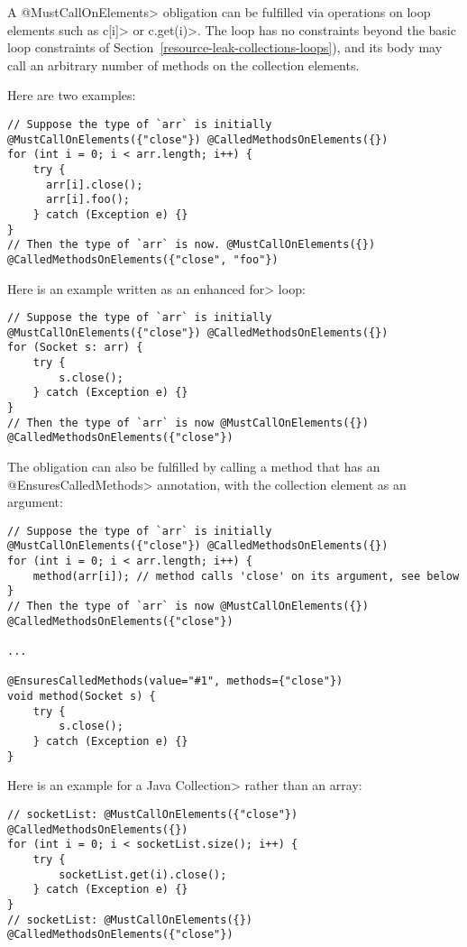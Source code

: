 A \<@MustCallOnElements> obligation can be fulfilled via operations on loop
elements such as \<c[i]> or \<c.get(i)>.
The loop has no constraints beyond the basic loop constraints of
Section~\ref{resource-leak-collections-loops}), and its body may call an
arbitrary number of methods on the collection elements.

Here are two examples:

\begin{verbatim}
// Suppose the type of `arr` is initially @MustCallOnElements({"close"}) @CalledMethodsOnElements({})
for (int i = 0; i < arr.length; i++) {
    try {
      arr[i].close();
      arr[i].foo();
    } catch (Exception e) {}
}
// Then the type of `arr` is now. @MustCallOnElements({}) @CalledMethodsOnElements({"close", "foo"})
\end{verbatim}

Here is an example written as an enhanced \<for> loop:

\begin{verbatim}
// Suppose the type of `arr` is initially @MustCallOnElements({"close"}) @CalledMethodsOnElements({})
for (Socket s: arr) {
    try {
        s.close();
    } catch (Exception e) {}
}
// Then the type of `arr` is now @MustCallOnElements({}) @CalledMethodsOnElements({"close"})
\end{verbatim}


The obligation can also be fulfilled by calling a method that has an
\<@EnsuresCalledMethods> annotation, with the collection element as an
argument:
\begin{verbatim}
// Suppose the type of `arr` is initially @MustCallOnElements({"close"}) @CalledMethodsOnElements({})
for (int i = 0; i < arr.length; i++) {
    method(arr[i]); // method calls 'close' on its argument, see below
}
// Then the type of `arr` is now @MustCallOnElements({}) @CalledMethodsOnElements({"close"})

...

@EnsuresCalledMethods(value="#1", methods={"close"})
void method(Socket s) {
    try {
        s.close();
    } catch (Exception e) {}
}
\end{verbatim}


Here is an example for a Java \<Collection> rather than an array:

\begin{verbatim}
// socketList: @MustCallOnElements({"close"}) @CalledMethodsOnElements({})
for (int i = 0; i < socketList.size(); i++) {
    try {
        socketList.get(i).close();
    } catch (Exception e) {}
}
// socketList: @MustCallOnElements({}) @CalledMethodsOnElements({"close"})
\end{verbatim}



